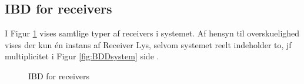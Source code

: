 \clearpage

\begin{landscape}
\subsection{IBD for receivers}

I Figur \ref{fig:IDBreceivers} vises samtlige typer af receivers i systemet. Af hensyn til overskuelighed vises der kun én instans af Receiver Lys, selvom systemet reelt indeholder to, jf multiplicitet i Figur \ref{fig:BDDsystem} side \pageref{fig:BDDsystem}.

\begin{figure}[h]
	\centering {}
	\caption{IBD for receivers}
	\label{fig:IDBreceivers}
\end{figure}
\end{landscape}

